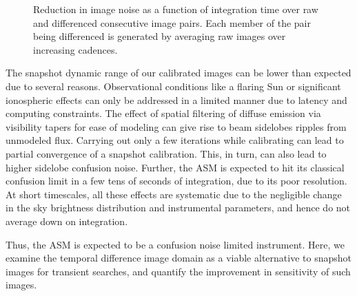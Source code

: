 \documentclass{aa}
\begin{document}
\begin{figure}[h]
\caption{\label{fig:Reduction-in-image}Reduction in image noise as a function of
  integration  time over  raw  and differenced  consecutive  image pairs.   Each
  member of the pair being differenced is generated by averaging raw images over
  increasing  cadences.}
\end{figure}

The snapshot dynamic  range of our calibrated images can  be lower than expected
due  to  several  reasons.   Observational  conditions like  a  flaring  Sun  or
significant ionospheric effects can only be addressed in a limited manner due to
latency and  computing constraints. The  effect of spatial filtering  of diffuse
emission  via visibility  tapers for  ease  of modeling  can give  rise to  beam
sidelobes ripples from unmodeled flux.  Carrying out only a few iterations while
calibrating can lead to partial  convergence of a snapshot calibration. This, in
turn, can  also lead  to higher  sidelobe confusion noise.  Further, the  ASM is
expected  to hit  its classical  confusion limit  in a  few tens  of  seconds of
integration, due to its poor  resolution. At short timescales, all these effects
are systematic due  to the negligible change in  the sky brightness distribution
and instrumental parameters, and hence do not average down on integration.

Thus, the ASM is expected to  be a confusion noise limited instrument.  Here, we
examine the temporal difference image domain as a viable alternative to snapshot
images for  transient searches, and  quantify the improvement in  sensitivity of
such images.
\end{document}
